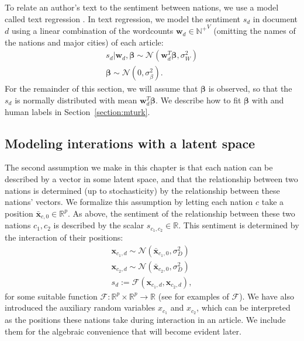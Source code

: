 To relate an author's text to the sentiment between nations, we use a
model called text regression \citep{kogan:2009}.  In text regression,
we model the sentiment $s_d$ in document $d$ using a linear
combination of the wordcounts $\bm w_d \in \mathbb{N^+}^V$ (omitting
the names of the nations and major cities) of each article:
\begin{align}
  s_d | \bm w_d, \bm \beta \sim \mathcal{N}( \bm w_d^T \bm \beta,
  \sigma_W^2 ) \nonumber \\
  \bm \beta \sim \mathcal{N}(0, \sigma_\beta^2 ).
  \label{eq:sentiment_text}
\end{align}
For the remainder of this section, we will assume that $\bm \beta$ is
observed, so that the $s_d$ is normally distributed with mean
$\bm w_d^T \bm \beta$.  We describe how to fit $\bm \beta$ with
 and human labels in
Section~\ref{section:mturk}.

\subsection{Modeling interations with a latent space}
\label{sec:fr_latent_space_model}
The second assumption we make in this chapter is that each nation can
be described by a vector in some latent space, and that the
relationship between two nations is determined (up to stochasticity)
by the relationship between these nations' vectors.  We formalize this
assumption by letting each nation $c$ take a position $\bm \bar
x_{c,0} \in \mathbb{R}^p$. As above, the sentiment of the relationship
between these two nations $c_1, c_2$ is described by the scalar
$s_{c_1,c_2} \in \mathbb{R}$.  This sentiment is determined by the
interaction of their positions:
\begin{align}
  \bm x_{c_1,d} \sim \mathcal{N}(\bm \bar x_{c_1, 0}, \sigma_D^2) \nonumber \\
  \bm x_{c_2,d} \sim \mathcal{N}(\bm \bar x_{c_2, 0}, \sigma_D^2) \nonumber \\
  s_d := \mathcal{F}(\bm x_{c_1,d}, \bm x_{c_2,d}), \label{eq:sentiment_space}
\end{align}
for some suitable function $\mathcal{F}: \mathbb{R}^p \times
\mathbb{R}^p \rightarrow \mathbb{R}$ (see 
for examples of $\mathcal{F}$).  We have also introduced the auxiliary
random variables $x_{c_1}$ and $x_{c_2}$, which can be interpreted as
the positions these nations take during interaction in an article.  We
include them for the algebraic convenience that will become evident
later.

